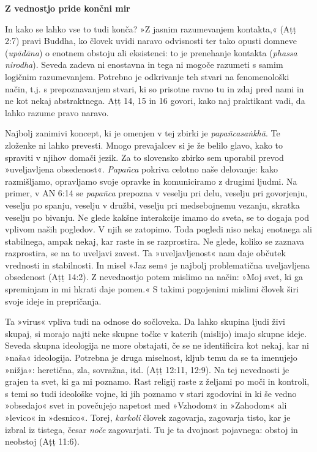\textbf{Z vednostjo pride končni mir}

In kako se lahko vse to tudi konča? »Z jasnim razumevanjem kontakta,«
(Aṭṭ 2:7) pravi Buddha, ko človek uvidi naravo odvisnosti ter tako
opusti domneve (\emph{upādāna}) o enotnem obstoju ali eksistenci: to je
prenehanje kontakta (\emph{phassa nirodha}). Seveda zadeva ni enostavna
in tega ni mogoče razumeti s samim logičnim razumevanjem. Potrebno je
odkrivanje teh stvari na fenomenološki način, t.j. s prepoznavanjem
stvari, ki so prisotne ravno tu in zdaj pred nami in ne kot nekaj
abstraktnega. Aṭṭ 14, 15 in 16 govori, kako naj praktikant vadi, da
lahko razume pravo naravo.

Najbolj zanimivi koncept, ki je omenjen v tej zbirki je
\emph{papañcasaṅkhā}. Te zloženke ni lahko prevesti. Mnogo prevajalcev
si je že belilo glavo, kako to spraviti v njihov domači jezik. Za to
slovensko zbirko sem uporabil prevod »uveljavljena obsedenost«.
\emph{Papañca} pokriva celotno naše delovanje: kako razmišljamo,
opravljamo svoje opravke in komuniciramo z drugimi ljudmi. Na primer, v
AN 6:14 se \emph{papañca} prepozna v veselju pri delu, veselju pri
govorjenju, veselju po spanju, veselju v družbi, veselju pri
medsebojnemu vezanju, skratka veselju po bivanju. Ne glede kakšne
interakcije imamo do sveta, se to dogaja pod vplivom naših pogledov. V
njih se zatopimo. Toda pogledi niso nekaj enotnega ali stabilnega, ampak
nekaj, kar raste in se razprostira. Ne glede, koliko se zaznava
razprostira, se na to uveljavi zavest. Ta »uveljavljenost« nam daje
občutek vrednosti in stabilnosti. In misel »Jaz sem« je najbolj
problematična uveljavljena obsedenost (Aṭṭ 14:2). Z nevednostjo potem
mislimo na način: »Moj svet, ki ga spreminjam in mi hkrati daje pomen.«
S takimi pogojenimi mislimi človek širi svoje ideje in prepričanja.

Ta »virus« vpliva tudi na odnose do sočloveka. Da lahko skupina ljudi
živi skupaj, si morajo najti neke skupne točke v katerih (mislijo) imajo
skupne ideje. Seveda skupna ideologija ne more obstajati, če se ne
identificira kot nekaj, kar ni »naša« ideologija. Potrebna je druga
miselnost, kljub temu da se ta imenujejo »nižja«: heretična, zla,
sovražna, itd. (Aṭṭ 12:11, 12:9). Na tej nevednosti je grajen ta svet,
ki ga mi poznamo. Rast religij raste z željami po moči in kontroli, s
temi so tudi ideološke vojne, ki jih poznamo v stari zgodovini in ki še
vedno »obsedajo« svet in povečujejo napetost med »Vzhodom« in »Zahodom«
ali »levico« in »desnico«. Torej, \emph{karkoli} človek zagovarja,
zagovarja tisto, kar je izbral iz tistega, česar \emph{noče}
zagovarjati. Tu je ta dvojnost pojavnega: obstoj in neobstoj (Aṭṭ 11:6).

